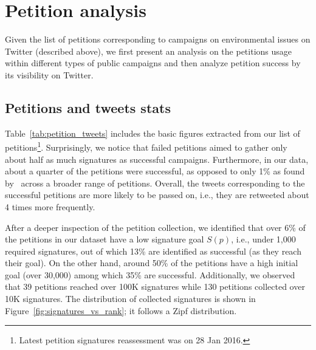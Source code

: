 \section{Petition analysis}
\label{sec:petition_analysis}

Given the list of petitions corresponding to campaigns on environmental issues on Twitter (described above), we first present an analysis on the petitions usage within different types of public campaigns and then analyze petition success by its visibility on Twitter.

\subsection{Petitions and tweets stats}
Table~\ref{tab:petition_tweets} includes the basic figures extracted from our list of petitions\footnote{Latest petition signatures reassessment was on 28 Jan 2016.}.
Surprisingly, we notice that failed petitions aimed to gather only about half as much signatures as successful campaigns.
Furthermore, in our data, about a quarter of the petitions were successful, as opposed to only 1\% as found by~\citeauthor{Huang2015}  across a broader range of petitions.
Overall, the tweets corresponding to the successful petitions are more likely to be passed on, i.e., they are retweeted about 4 times more frequently.

After a deeper inspection of the petition collection, we identified that over 6\% of the petitions in our dataset have a low signature goal $S(p)$, i.e., under 1,000 required signatures, out of which 13\% are identified as successful (as they reach their goal).
On the other hand, around 50\% of the petitions have a high initial goal (over 30,000) among which 35\% are successful.
Additionally, we observed that 39 petitions reached over 100K signatures while 130 petitions collected over 10K signatures.
The distribution of collected signatures is shown in Figure~\ref{fig:signatures_vs_rank}; it follows a Zipf distribution.

